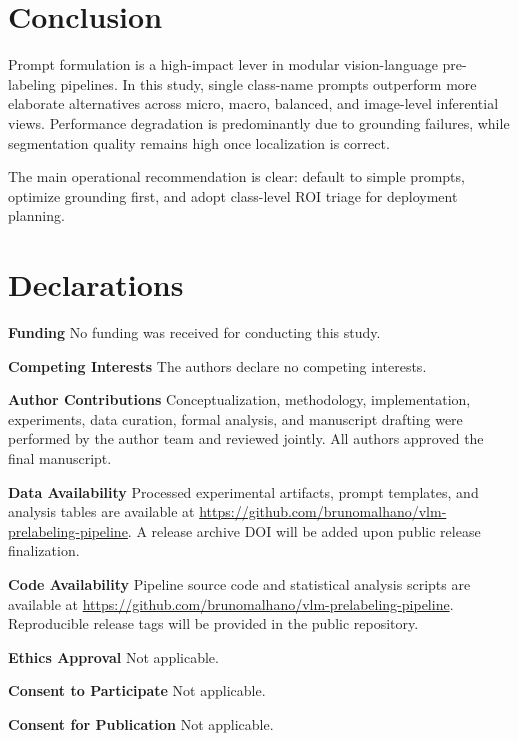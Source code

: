 \documentclass[pdflatex,sn-mathphys-num]{sn-jnl}
\newcommand{\publicrepo}{https://github.com/brunomalhano/vlm-prelabeling-pipeline}
\begin{document}
\section{Conclusion}

Prompt formulation is a high-impact lever in modular vision-language pre-labeling pipelines. In this study, single class-name prompts outperform more elaborate alternatives across micro, macro, balanced, and image-level inferential views. Performance degradation is predominantly due to grounding failures, while segmentation quality remains high once localization is correct.

The main operational recommendation is clear: default to simple prompts, optimize grounding first, and adopt class-level ROI triage for deployment planning.

\section*{Declarations}

\textbf{Funding} No funding was received for conducting this study.

\textbf{Competing Interests} The authors declare no competing interests.

\textbf{Author Contributions} Conceptualization, methodology, implementation, experiments, data curation, formal analysis, and manuscript drafting were performed by the author team and reviewed jointly. All authors approved the final manuscript.

\textbf{Data Availability} Processed experimental artifacts, prompt templates, and analysis tables are available at \url{\publicrepo}. A release archive DOI will be added upon public release finalization.

\textbf{Code Availability} Pipeline source code and statistical analysis scripts are available at \url{\publicrepo}. Reproducible release tags will be provided in the public repository.

\textbf{Ethics Approval} Not applicable.

\textbf{Consent to Participate} Not applicable.

\textbf{Consent for Publication} Not applicable.
\end{document}
